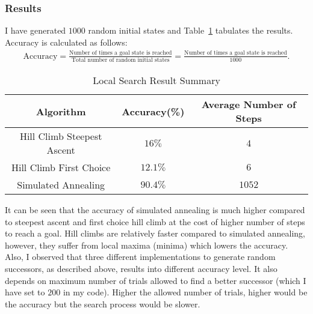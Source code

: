 \subsubsection*{Results}
I have generated $1000$ random initial states and Table~\ref{tbl:local_search_summary} tabulates the results. Accuracy is calculated as follows:
\begin{align*}
	\text{Accuracy} = \frac{\text{Number of times a goal state is reached}}{\text{Total number of random initial states}} = \frac{\text{Number of times a goal state is reached}}{1000}.
\end{align*}
\begin{table}[ht]
	\centering
	\caption{Local Search Result Summary}
	\begin{tabular}[t]{ccc} 
		\hline
		Algorithm & Accuracy(\%) & Average Number of Steps\\ [0.5ex] 
		\hline
		Hill Climb Steepest Ascent 	& $16\%$ 	& $4$\\
		Hill Climb First Choice 	& $12.1\%$ 	& $6$\\
		Simulated Annealing			& $90.4\%$	& $1052$\\[1ex]
		\hline
	\end{tabular}
	\label{tbl:local_search_summary}
\end{table}

It can be seen that the accuracy of simulated annealing is much higher compared to steepest ascent and first choice hill climb at the cost of higher number of steps to reach a goal. Hill climbs are relatively faster compared to simulated annealing, however, they suffer from local maxima (minima) which lowers the accuracy. Also, I observed that three different implementations to generate random successors, as described above, results into different accuracy level. It also depends on maximum number of trials allowed to find a better successor (which I have set to $200$ in my code). Higher the allowed number of trials, higher would be the accuracy but the search process would be slower.